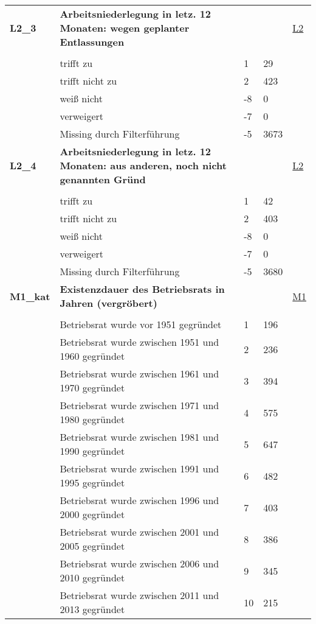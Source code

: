 \begin{longtable}{| L{2.5cm} | L{8.25cm}| C{1.5cm} | R{1.25cm} | C{2.25cm} |  }
   \midrule
\textbf{L2\_3}\label{var:suf:L2:3} & \textbf{Arbeitsniederlegung in letz. 12 Monaten: wegen geplanter Entlassungen} &  &  & \hyperref[L2]{L2} \\ 
   &  &  &  &  \\ 
   & trifft zu & 1 & 29 &  \\ 
   & trifft nicht zu & 2 & 423 &  \\ 
   & weiß nicht & -8 & 0 &  \\ 
   & verweigert & -7 & 0 &  \\ 
   & Missing durch Filterführung & -5 & 3673 &  \\ 
   \midrule
\textbf{L2\_4}\label{var:suf:L2:4} & \textbf{Arbeitsniederlegung in letz. 12 Monaten: aus anderen, noch nicht genannten Gründ} &  &  & \hyperref[L2]{L2} \\ 
   &  &  &  &  \\ 
   & trifft zu & 1 & 42 &  \\ 
   & trifft nicht zu & 2 & 403 &  \\ 
   & weiß nicht & -8 & 0 &  \\ 
   & verweigert & -7 & 0 &  \\ 
   & Missing durch Filterführung & -5 & 3680 &  \\ 
   \midrule
\textbf{M1\_kat}\label{var:suf:M1:kat} & \textbf{Existenzdauer des Betriebsrats in Jahren (vergröbert)} &  &  & \hyperref[M1]{M1} \\ 
   &  &  &  &  \\ 
   & Betriebsrat wurde vor 1951 gegründet & 1 & 196 &  \\ 
   & Betriebsrat wurde zwischen 1951  und 1960 gegründet & 2 & 236 &  \\ 
   & Betriebsrat wurde zwischen 1961  und 1970 gegründet & 3 & 394 &  \\ 
   & Betriebsrat wurde zwischen 1971  und 1980 gegründet & 4 & 575 &  \\ 
   & Betriebsrat wurde zwischen 1981  und 1990 gegründet & 5 & 647 &  \\ 
   & Betriebsrat wurde zwischen 1991  und 1995 gegründet & 6 & 482 &  \\ 
   & Betriebsrat wurde zwischen 1996  und 2000 gegründet & 7 & 403 &  \\ 
   & Betriebsrat wurde zwischen 2001  und 2005 gegründet & 8 & 386 &  \\ 
   & Betriebsrat wurde zwischen 2006  und 2010 gegründet & 9 & 345 &  \\ 
   & Betriebsrat wurde zwischen 2011  und 2013 gegründet & 10 & 215 &  \\ 

\end{longtable}
